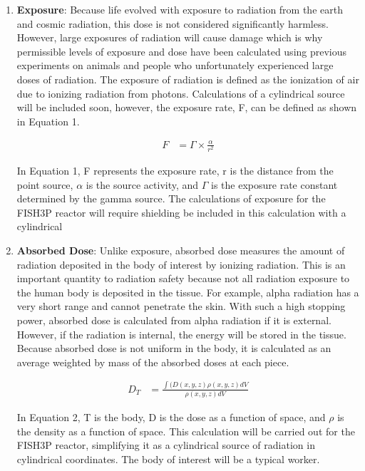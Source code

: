 \documentclass[12pt]{article}
\begin{document}
\begin{enumerate}
\item \textbf{Exposure}: \newline
Because life evolved with exposure to radiation from the earth and cosmic radiation, this dose is not considered significantly harmless.  However, large exposures of radiation will cause damage which is why permissible levels of exposure and dose have been calculated using previous experiments on animals and people who unfortunately experienced large doses of radiation.  The exposure of radiation is defined as the ionization of air due to ionizing radiation from photons.  Calculations of a cylindrical source will be included soon, however, the exposure rate, F, can be defined as shown in Equation 1.

\begin{align}
F &= \Gamma \times \frac{\alpha}{r^2} 
\end{align}

In Equation 1, F represents the exposure rate, r is the distance from the point source, $\alpha$ is the source activity, and $\Gamma$ is the exposure rate constant determined by the gamma source.  The calculations of exposure for the FISH3P reactor will require shielding be included in this calculation with a cylindrical 

\item \textbf{Absorbed Dose}: \newline
Unlike exposure, absorbed dose measures the amount of radiation deposited in the body of interest by ionizing radiation.  This is an important quantity to radiation safety because not all radiation exposure to the human body is deposited in the tissue.  For example, alpha radiation has a very short range and cannot penetrate the skin.  With such a high stopping power, absorbed dose is calculated from alpha radiation if it is external.  However, if the radiation is internal, the energy will be stored in the tissue.  Because absorbed dose is not uniform in the body, it is calculated as an average weighted by mass of the absorbed doses at each piece.

\begin{align}
D_T &= \frac{\int(D(x,y,z)\rho(x,y,z)dV}{\rho(x,y,z)dV} 
\end{align}

In Equation 2, T is the body, D is the dose as a function of space, and $\rho$ is the density as a function of space.  This calculation will be carried out for the FISH3P reactor, simplifying it as a cylindrical source of radiation in cylindrical coordinates.  The body of interest will be a typical worker.


\end{enumerate}
\end{document}
